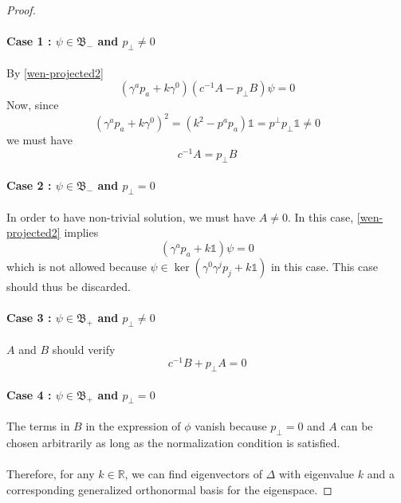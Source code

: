 \begin{proof}
\paragraph{Case 1 : $\psi \in \mathfrak{B}_-$ and $p_\bot \neq 0$} 
By \cref{wen-projected2}
\begin{equation*}
(\gamma^a p_a + k\gamma^0)(c^{-1}A - p_\bot B) \psi = 0
\end{equation*}
Now, since 
\begin{equation*}
(\gamma^a p_a + k\gamma^0)^2 = ( k^2 - p^a p_a ) \mathbb{1}= p^\bot p_\bot \mathbb{1} \neq 0
\end{equation*}
we must have 
\begin{equation*}
c^{-1} A = p_\bot B
\end{equation*}
\paragraph{Case 2 : $\psi \in \mathfrak{B}_-$ and $p_\bot = 0$}
In order to have non-trivial solution, 
we must have $A \neq 0$. 
In this case, 
\cref{wen-projected2} implies 
\begin{equation*}
(\gamma^a p_a + k \mathbb{1})\psi = 0
\end{equation*}
which is not allowed because $\psi\in\ker(\gamma^0\gamma^jp_j + k\mathbb{1})$ in this case. 
This case should thus be discarded.
\paragraph{Case 3 : $\psi \in \mathfrak{B}_+$ and $p_\bot \neq 0$}
$A$ and $B$ should verify 
\begin{equation*}
c^{-1} B + p_\bot A = 0
\end{equation*}
\paragraph{Case 4 : $\psi \in \mathfrak{B}_+$ and $p_\bot = 0$}
The terms in $B$ in the expression of $\phi$ vanish because  $p_\perp = 0$ and $A$ can be chosen arbitrarily as long as the normalization condition is satisfied.
\\\\
Therefore, for any $k\in\mathbb{R}$, 
we can find eigenvectors of $\Delta$ with eigenvalue $k$ and a corresponding generalized orthonormal basis for the eigenspace.
\end{proof}